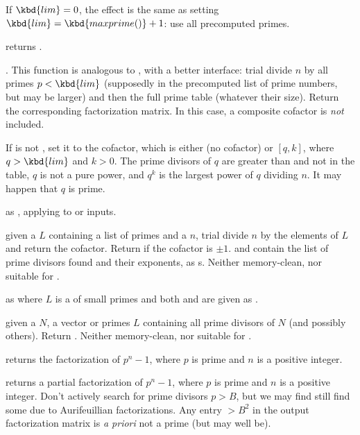 If $\kbd{lim} = 0$, the effect is the same as setting $\kbd{lim} =
\kbd{maxprime()} + 1$: use all precomputed primes.

 returns
.

. This function
is analogous to
, with a better interface: trial divide $n$ by all
primes $p < \kbd{lim}$ (supposedly in the precomputed list of prime numbers,
but  may be larger) and then the full  prime table
(whatever their size).
Return the corresponding factorization matrix. In this case, a composite
cofactor is \emph{not} included.

If  is not , set it to the cofactor, which is either
 (no cofactor) or $[q,k]$, where $q > \kbd{lim}$ and $k > 0$.
The prime divisors of $q$ are greater than  and not in the
 table, $q$ is not a pure power, and $q^k$ is the largest
power of $q$ dividing $n$. It may happen that $q$ is prime.

 as , applying to
 or  inputs.

 given a 
$L$ containing a list of primes and a  $n$, trial divide
$n$ by the elements of $L$ and return the cofactor. Return  if the
cofactor is $\pm 1$.  and  contain the list of prime divisors
found and their exponents, as s. Neither memory-clean, nor
suitable for .

 as
 where $L$ is a  of small primes and both
 and  are given as .

 given a  $N$, a vector or
primes $L$ containing all prime divisors of $N$ (and possibly others). Return
. Neither memory-clean, nor suitable for .

 returns the factorization of $p^n-1$,
where $p$ is prime and $n$ is a positive integer.

 returns a partial
factorization of $p^n-1$, where $p$ is prime and $n$ is a positive integer.
Don't actively search for prime divisors $p > B$, but we may find still find
some due to Aurifeuillian factorizations. Any entry $> B^2$ in the output
factorization matrix is \emph{a priori} not a prime (but may well be).

